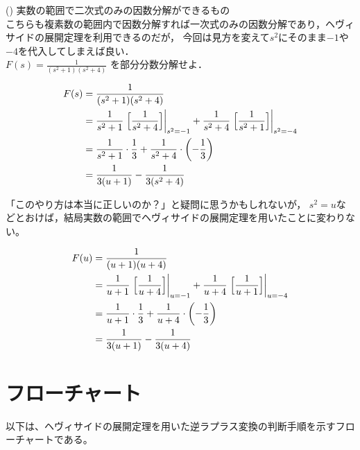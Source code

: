 \documentclass[a4paper,12pt]{report}
\begin{document}
\newpage

\quad (\MakeUppercase{}) 実数の範囲で二次式のみの因数分解ができるもの \\

こちらも複素数の範囲内で因数分解すれば一次式のみの因数分解であり，ヘヴィサイドの展開定理を利用できるのだが，
今回は見方を変えて\(s^2\)にそのまま\(-1\)や\(-4\)を代入してしまえば良い．\\

    
  \quad \(F(s) = \frac{1}{\left(s^2+1\right) \left(s^2+4\right)} \) を部分分数分解せよ．
    
  \begin{align*}
    F(s) &= \frac{1}{(s^2+1)(s^2+4)} \\
        &= \frac{1}{s^2+1}\left.\Bigl[\frac{1}{s^2+4}\Bigr]\right|_{s^2=-1} 
            + \frac{1}{s^2+4}\left.\Bigl[\frac{1}{s^2+1}\Bigr]\right|_{s^2=-4}\\
        &= \frac{1}{s^2+1} \cdot \frac{1}{3}
            + \frac{1}{s^2+4} \cdot \left(-\frac{1}{3} \right)\\
        &= \frac{1}{3(u+1)} 
            - \frac{1}{3(s^2+4)} \\
  \end{align*}

  「このやり方は本当に正しいのか？」と疑問に思うかもしれないが，
  \(s^2=u\)などとおけば，結局実数の範囲でヘヴィサイドの展開定理を用いたことに変わりない。

  \begin{align*}
    F(u) &= \frac{1}{(u+1)(u+4)} \\
        &= \frac{1}{u+1}\left.\Bigl[\frac{1}{u+4}\Bigr]\right|_{u=-1} 
            + \frac{1}{u+4}\left.\Bigl[\frac{1}{u+1}\Bigr]\right|_{u=-4}\\
        &= \frac{1}{u+1} \cdot \frac{1}{3}
            + \frac{1}{u+4} \cdot \left(-\frac{1}{3} \right)\\
        &= \frac{1}{3(u+1)} 
            - \frac{1}{3(u+4)} \\
  \end{align*}


\chapter{フローチャート}
以下は、ヘヴィサイドの展開定理を用いた逆ラプラス変換の判断手順を示すフローチャートである。
\end{document}
